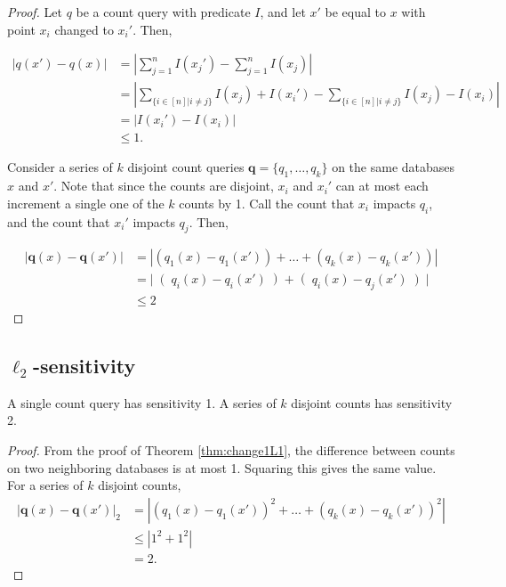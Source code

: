 \documentclass[11pt]{scrartcl} %
\begin{document}
\begin{proof}
Let $q$ be a count query with predicate $I$, and let $x'$ be equal to $x$ with point $x_i$ changed to $x_i'$. Then,

\begin{align*}
\left\vert q(x') - q(x) \right\vert &= \left\vert \sum_{j=1}^n I(x_j') - \sum_{j=1}^n I(x_j) \right\vert \\
	&= \left\vert \sum_{\{ i \in [n] \vert i \ne j\}} I(x_j) + I(x_i') - \sum_{\{ i \in [n] \vert i \ne j\}} I(x_j) - I(x_i) \right\vert \\
	&= \left\vert I(x_i') - I(x_i) \right\vert \\
	& \le 1.
\end{align*}

Consider a series of $k$ disjoint count queries $\mathbf{q} = \{q_1, \ldots, q_k\}$ on the same databases $x$ and $x'$. Note that since the counts are disjoint, $x_i$ and $x_i'$ can at most each increment a single one of the $k$ counts by 1. Call the count that $x_i$ impacts $q_i$, and the count that $x_i'$ impacts $q_j$. Then,

\begin{align*}
\left\vert \mathbf{q}(x) - \mathbf{q}(x') \right\vert &= \left\vert \left(q_1(x) - q_1(x')\right) + \ldots + \left(q_k(x) - q_k(x')\right) \right\vert \\
	&= \left\vert \right(q_i(x) - q_i(x')\left) + \right(q_i(x) - q_j(x')\left) \right\vert \\
	&\le 2
\end{align*}
\end{proof}

\subsection{$\ell_2$-sensitivity}

\begin{theorem}
A single count query has sensitivity 1. A series of $k$ disjoint counts has sensitivity 2.
\end{theorem}

\begin{proof}
From the proof of Theorem \ref{thm:change1L1}, the difference between counts on two neighboring databases is at most 1. Squaring this gives the same value. For a series of $k$ disjoint counts,
\begin{align*}
\left\vert \mathbf{q}(x) - \mathbf{q}(x') \right\vert_2 &= \left\vert \left(q_1(x) - q_1(x')\right)^2 + \ldots + \left(q_k(x) - q_k(x')\right)^2 \right\vert \\
 & \le \left\vert 1^2 + 1^2 \right\vert \\
 &= 2.
 \end{align*}
\end{proof}
\end{document}

